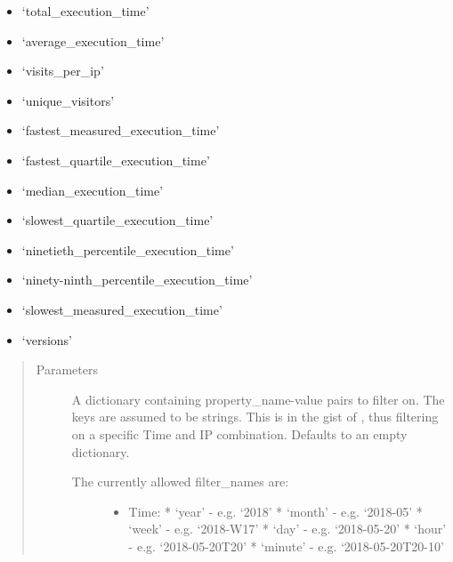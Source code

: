 \documentclass[letterpaper,10pt,english]{sphinxmanual}
\begin{document}
\begin{fulllineitems}
\begin{fulllineitems}
\begin{itemize}
\item {} 
‘total\_execution\_time’

\item {} 
‘average\_execution\_time’

\item {} 
‘visits\_per\_ip’

\item {} 
‘unique\_visitors’

\item {} 
‘fastest\_measured\_execution\_time’

\item {} 
‘fastest\_quartile\_execution\_time’

\item {} 
‘median\_execution\_time’

\item {} 
‘slowest\_quartile\_execution\_time’

\item {} 
‘ninetieth\_percentile\_execution\_time’

\item {} 
‘ninety-ninth\_percentile\_execution\_time’

\item {} 
‘slowest\_measured\_execution\_time’

\item {} 
‘versions’

\end{itemize}
\begin{quote}\begin{description}
\item[{Parameters}] \leavevmode
{} \textendash{} 
A dictionary containing property\_name-value pairs to filter on. The keys are assumed to be strings.
This is in the gist of , thus filtering on a specific Time and IP combination.
Defaults to an empty dictionary.
\begin{description}
\item[{The currently allowed filter\_names are:}] \leavevmode\begin{itemize}
\item {} 
Time:
* ‘year’   - e.g. ‘2018’
* ‘month’  - e.g. ‘2018-05’
* ‘week’   - e.g. ‘2018-W17’
* ‘day’    - e.g. ‘2018-05-20’
* ‘hour’   - e.g. ‘2018-05-20T20’
* ‘minute’ - e.g. ‘2018-05-20T20-10’

\end{itemize}


\end{description}
\end{description}
\end{quote}
\end{fulllineitems}
\end{fulllineitems}
\end{document}
